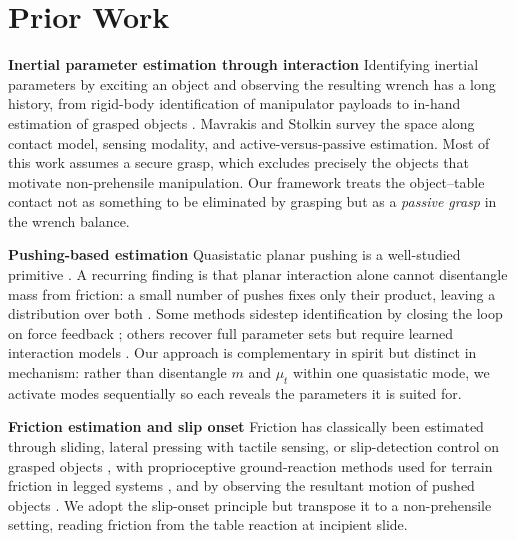 \documentclass[10pt, conference]{IEEEtran}
\begin{document}
\section{Prior Work}

\noindent \textbf{Inertial parameter estimation through interaction} Identifying inertial parameters by exciting an object and observing the resulting wrench has a long history, from rigid-body identification of manipulator payloads to in-hand estimation of grasped objects \cite{kubus_-line_2007, sundaralingam_-hand_2021}. Mavrakis and Stolkin \cite{mavrakis_estimation_2020} survey the space along contact model, sensing modality, and active-versus-passive estimation. Most of this work assumes a secure grasp, which excludes precisely the objects that motivate non-prehensile manipulation. Our framework treats the object--table contact not as something to be eliminated by grasping but as a \emph{passive grasp} in the wrench balance.

\noindent \textbf{Pushing-based estimation} Quasistatic planar pushing is a well-studied primitive \cite{mason_mechanics_1986, bauza_probabilistic_2017}. A recurring finding is that planar interaction alone cannot disentangle mass from friction: a small number of pushes fixes only their product, leaving a distribution over both \cite{bauza_probabilistic_2017}. Some methods sidestep identification by closing the loop on force feedback \cite{heins_force_2024}; others recover full parameter sets but require learned interaction models \cite{dutta_push_2023}. Our approach is complementary in spirit but distinct in mechanism: rather than disentangle $m$ and $\mu_t$ within one quasistatic mode, we activate modes sequentially so each reveals the parameters it is suited for.

\noindent \textbf{Friction estimation and slip onset} Friction has classically been estimated through sliding, lateral pressing with tactile sensing, or slip-detection control on grasped objects \cite{sundaralingam_-hand_2021}, with proprioceptive ground-reaction methods used for terrain friction in legged systems \cite{kim_online_2025}, and by observing the resultant motion of pushed objects \cite{lynch_estimating_1993}. We adopt the slip-onset principle but transpose it to a non-prehensile setting, reading friction from the table reaction at incipient slide.
\end{document}
